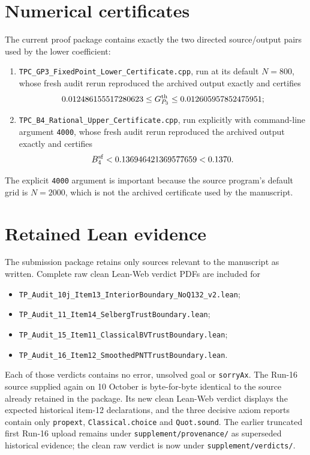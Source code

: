 \documentclass[11pt]{article}
\newcommand{\code}[1]{\texttt{#1}}
\begin{document}
\section{Numerical certificates}
The current proof package contains exactly the two directed source/output pairs used by the lower coefficient:
\begin{enumerate}[label=(\roman*)]
\item \code{TPC\_GP3\_FixedPoint\_Lower\_Certificate.cpp}, run at its default $N=800$, whose fresh audit rerun reproduced the archived output exactly and certifies
\[
0.012486155517280623\le G_{P_3}^{\rm th}\le0.012605957852475951;
\]
\item \code{TPC\_B4\_Rational\_Upper\_Certificate.cpp}, run explicitly with command-line argument \code{4000}, whose fresh audit rerun reproduced the archived output exactly and certifies
\[
B_4^{\rm sf}<0.136946421369577659<0.1370.
\]
\end{enumerate}
The explicit \code{4000} argument is important because the source program's default grid is $N=2000$, which is not the archived certificate used by the manuscript.

\section{Retained Lean evidence}
The submission package retains only sources relevant to the manuscript as written.  Complete raw clean Lean-Web verdict PDFs are included for
\begin{itemize}[leftmargin=*]
\item \code{TP\_Audit\_10j\_Item13\_InteriorBoundary\_NoQ132\_v2.lean};
\item \code{TP\_Audit\_11\_Item14\_SelbergTrustBoundary.lean};
\item \code{TP\_Audit\_15\_Item11\_ClassicalBVTrustBoundary.lean};
\item \code{TP\_Audit\_16\_Item12\_SmoothedPNTTrustBoundary.lean}.
\end{itemize}
Each of those verdicts contains no error, unsolved goal or \code{sorryAx}.  The Run-16 source supplied again on 10 October is byte-for-byte identical to the source already retained in the package.  Its new clean Lean-Web verdict displays the expected historical item-12 declarations, and the three decisive axiom reports contain only \code{propext}, \code{Classical.choice} and \code{Quot.sound}.  The earlier truncated first Run-16 upload remains under \code{supplement/provenance/} as superseded historical evidence; the clean raw verdict is now under \code{supplement/verdicts/}.
\end{document}
